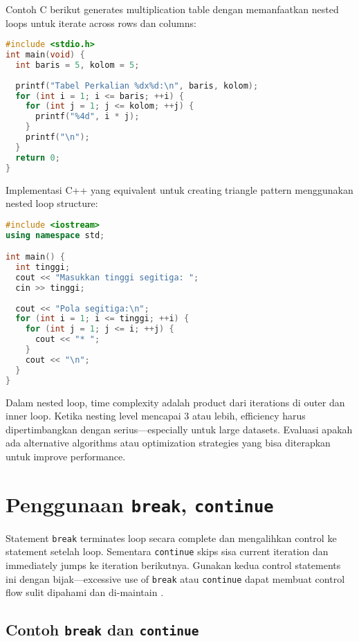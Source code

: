 \documentclass[../main.tex]{subfiles}
\begin{document}
Contoh C berikut generates multiplication table dengan memanfaatkan nested loops untuk iterate across rows dan columns:

\begin{lstlisting}[language=C, caption={Tabel perkalian dengan nested loop (C)}]
#include <stdio.h>
int main(void) {
  int baris = 5, kolom = 5;
  
  printf("Tabel Perkalian %dx%d:\n", baris, kolom);
  for (int i = 1; i <= baris; ++i) {
    for (int j = 1; j <= kolom; ++j) {
      printf("%4d", i * j);
    }
    printf("\n");
  }
  return 0;
}
\end{lstlisting}

Implementasi C++ yang equivalent untuk creating triangle pattern menggunakan nested loop structure:

\begin{lstlisting}[language=C++, caption={Pola bintang dengan nested loop (C++)}]
#include <iostream>
using namespace std;

int main() {
  int tinggi;
  cout << "Masukkan tinggi segitiga: ";
  cin >> tinggi;
  
  cout << "Pola segitiga:\n";
  for (int i = 1; i <= tinggi; ++i) {
    for (int j = 1; j <= i; ++j) {
      cout << "* ";
    }
    cout << "\n";
  }
}
\end{lstlisting}

Dalam nested loop, time complexity adalah product dari iterations di outer dan inner loop. Ketika nesting level mencapai 3 atau lebih, efficiency harus dipertimbangkan dengan serius—especially untuk large datasets. Evaluasi apakah ada alternative algorithms atau optimization strategies yang bisa diterapkan untuk improve performance.

\section{Penggunaan \texttt{break}, \texttt{continue}}
Statement \texttt{break} terminates loop secara complete dan mengalihkan control ke statement setelah loop. Sementara \texttt{continue} skips sisa current iteration dan immediately jumps ke iteration berikutnya. Gunakan kedua control statements ini dengan bijak—excessive use of \texttt{break} atau \texttt{continue} dapat membuat control flow sulit dipahami dan di-maintain \parencite{gnu-c-manual,cpp-reference}.

\subsection{Contoh \texttt{break} dan \texttt{continue}}
\end{document}

